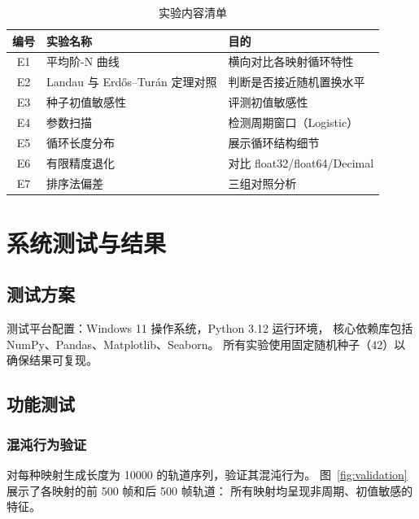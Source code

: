 \documentclass[12pt,a4paper]{ctexrep}
\begin{document}
\begin{table}[H]
  \centering
  \caption{实验内容清单}
  \begin{tabular}{cll}
    \toprule
    编号 & 实验名称 & 目的 \\
    \midrule
    E1 & 平均阶-N 曲线 & 横向对比各映射循环特性 \\
    E2 & Landau 与 Erdős--Turán 定理对照 & 判断是否接近随机置换水平 \\
    E3 & 种子初值敏感性 & 评测初值敏感性 \\
    E4 & 参数扫描 & 检测周期窗口（Logistic） \\
    E5 & 循环长度分布 & 展示循环结构细节 \\
    E6 & 有限精度退化 & 对比 float32/float64/Decimal \\
    E7 & 排序法偏差 & 三组对照分析 \\
    \bottomrule
  \end{tabular}
\end{table}

\chapter{系统测试与结果}

\section{测试方案}

测试平台配置：Windows 11 操作系统，Python 3.12 运行环境，
核心依赖库包括 NumPy、Pandas、Matplotlib、Seaborn。
所有实验使用固定随机种子（42）以确保结果可复现。

\section{功能测试}

\subsection{混沌行为验证}

对每种映射生成长度为 10000 的轨道序列，验证其混沌行为。
图~\ref{fig:validation} 展示了各映射的前 500 帧和后 500 帧轨道：
所有映射均呈现非周期、初值敏感的特征。
\end{document}
